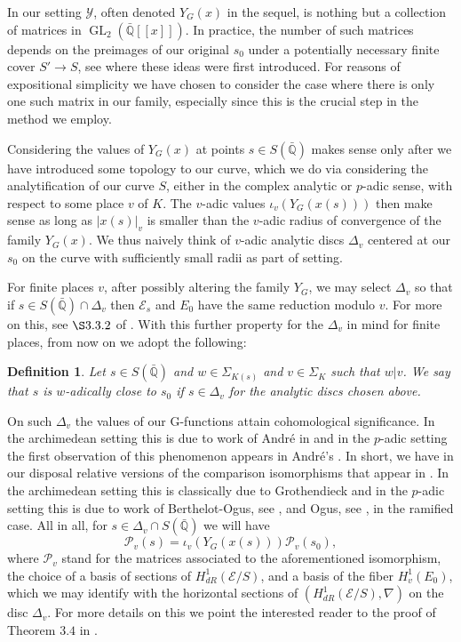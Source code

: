 \documentclass[12pt,twoside,a4paper]{article}
\theoremstyle{plain}%
\newtheorem{definition}[theorem]{Definition} %
\DeclareMathOperator{\GL}{GL}
\newcommand{\Q}{\mathbb{Q}}
\newcommand{\CE}{\mathcal{E}}
\newcommand{\CP}{\mathcal{P}}
\begin{document}
In our setting $\mathcal{Y}$, often denoted $Y_G(x)$ in the sequel, is nothing but a collection of matrices in $\GL_2(\bar{\Q}[[x]])$. In practice, the number of such matrices depends on the preimages of our original $s_0$ under a potentially necessary finite cover $S'\rightarrow S$, see \cite{daworr4} where these ideas were first introduced. For reasons of expositional simplicity we have chosen to consider the case where there is only one such matrix in our family, especially since this is the crucial step in the method we employ. 

Considering the values of $Y_G(x)$ at points $s\in S(\bar{\Q})$ makes sense only after we have introduced some topology to our curve, which we do via considering the analytification of our curve $S$, either in the complex analytic or $p$-adic sense, with respect to some place $v$ of $K$. The $v$-adic values $\iota_v(Y_G(x(s)))$ then make sense as long as $|x(s)|_v$ is smaller than the $v$-adic radius of convergence of the family $Y_G(x)$. We thus naively think of $v$-adic analytic discs $\Delta_v$ centered at our $s_0$ on the curve with sufficiently small radii as part of setting.

For finite places $v$, after possibly altering the family $Y_G$, we may select $\Delta_v$ so that if $s\in S(\bar{\Q})\cap \Delta_v$ then $\CE_s$ and $E_0$ have the same reduction modulo $v$. For more on this, see $\S 3.3.2$ of \cite{papaspadicpart1}. With this further property for the $\Delta_v$ in mind for finite places, from now on we adopt the following:
\begin{definition}\label{defnvadicprox}
	Let $s\in S(\bar{\Q})$ and $w\in\Sigma_{K(s)}$ and $v\in\Sigma_{K}$ such that $w|v$. We say that $s$ is $w$-adically close to $s_0$ if $s\in \Delta_v$ for the analytic discs chosen above.
\end{definition}

On such $\Delta_v$ the values of our G-functions attain cohomological significance. In the archimedean setting this is due to work of Andr\'e in \cite{andre1989g} and in the $p$-adic setting the first observation of this phenomenon appears in Andr\'e's \cite{andremots}. In short, we have in our disposal relative versions of the comparison isomorphisms that appear in . In the archimedean setting this is classically due to Grothendieck and in the $p$-adic setting this is due to work of Berthelot-Ogus, see \cite{bertogus}, and Ogus, see \cite{ogus}, in the ramified case. All in all, for $s\in\Delta_v\cap S(\bar{\Q})$ we will have \begin{equation}
	\CP_v(s)=\iota_v(Y_G(x(s)))\CP_v(s_0),
\end{equation}where $\CP_v$ stand for the matrices associated to the aforementioned isomorphism, the choice of a basis of sections of $H^1_{dR}(\CE/S)$, and a basis of the fiber $H^1_v(E_0)$, which we may identify with the horizontal sections of $(H^1_{dR}(\CE/S),\nabla)$ on the disc $\Delta_v$. For more details on this we point the interested reader to the proof of Theorem $3.4$ in \cite{papaspadicpart1}.
\end{document}
